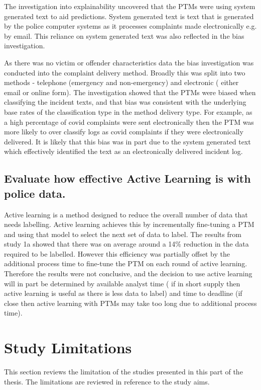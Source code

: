 The investigation into explainability uncovered that the PTMs were using system generated text to aid predictions. System generated text is text that is generated by the police computer systems as it processes complaints made electronically e.g. by email. This reliance on system generated text was also reflected in the bias investigation.

As there was no victim or offender characteristics data the bias investigation was conducted into the complaint delivery method. Broadly this was split into two methods - telephone (emergency and non-emergency) and electronic ( either email or online form). The investigation showed that the PTMs were biased when classifying the incident texts, and that bias was consistent with the underlying base rates of the classification type in the method delivery type. For example, as a high percentage of covid complaints were sent electronically then the PTM was more likely to over classify logs as covid complaints if they were electronically delivered.  It is likely that this bias was in part due to the system generated text which effectively identified the text as an electronically delivered incident log.

\subsection{Evaluate how effective Active Learning is with police data.}  Active learning is a method designed to reduce the overall number of data that needs labelling. Active learning achieves this by incrementally fine-tuning a PTM and using that model to select the next set of data to label. The results from study 1a showed that there was on average around a 14\% reduction in the data required to be labelled. However this efficiency was partially offset by the additional process time to fine-tune the PTM on each round of active learning. Therefore the results were not conclusive, and the decision to use active learning will in part be determined by available analyst time ( if in short supply then active learning is useful as there is less data to label)  and time to deadline (if close then active learning with PTMs may take too long due to additional process time).

\section{Study Limitations} This section reviews the limitation of the studies presented in this part of the thesis. The limitations are reviewed in reference to the study aims.

